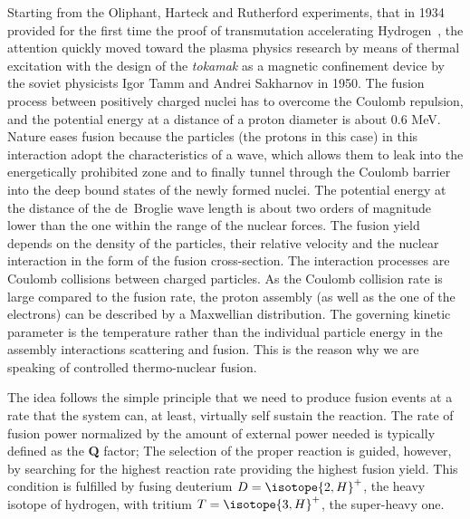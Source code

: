 Starting from the Oliphant, Harteck and Rutherford experiments, that in 1934 provided for the first time the proof of transmutation accelerating Hydrogen~\cite{1934RSPSA.144..692O}, the attention quickly moved toward the plasma physics research by means of thermal excitation with the design of the \textit{tokamak} as a magnetic confinement device by the soviet physicists Igor Tamm and Andrei Sakharnov in 1950.%
%
The fusion process between positively charged nuclei has to overcome the Coulomb repulsion, and the potential energy at a distance of a proton diameter is about 0.6 MeV. Nature eases fusion because the particles (the protons in this case) in this interaction adopt the characteristics of a wave, which allows them to leak into the energetically prohibited zone and to finally tunnel through the Coulomb barrier into the deep bound states of the newly formed nuclei. The potential energy at the distance of the de~Broglie wave length is about two orders of magnitude lower than the one within the range of the nuclear forces. The fusion yield depends on the density of the particles, their relative velocity and the nuclear interaction in the form of the fusion cross-section. 
The interaction processes are Coulomb collisions between charged particles. As the Coulomb collision rate is large compared to the fusion rate, the proton assembly (as well as the one of the electrons) can be described by a Maxwellian distribution. The governing kinetic parameter is the temperature rather than the individual particle energy in the assembly interactions scattering and fusion. This is the reason why we are speaking of controlled thermo-nuclear fusion.

The idea follows the simple principle that we need to produce fusion events at a rate that the system can, at least, virtually self sustain the reaction. 
\cite{Wagner.Friedrich:magnetic.confinement.intro}
The rate of fusion power normalized by the amount of external power needed is typically defined as the \textbf{Q} factor; 
The selection of the proper reaction is guided, however, by searching for the highest reaction rate providing the highest fusion yield. This condition is fulfilled by fusing deuterium $D=\isotope{2,H}^+$, the heavy isotope of hydrogen, with tritium $T=\isotope{3,H}^+$, the super-heavy one.

